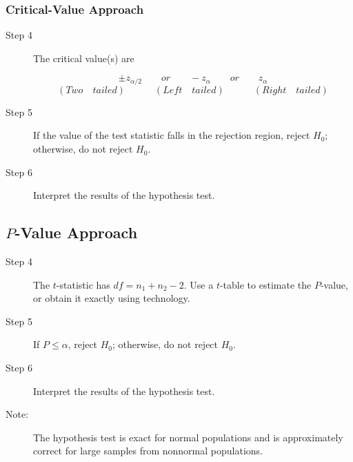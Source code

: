 \documentclass[12pt]{article}
\begin{document}
                \subsubsection*{Critical-Value Approach}
                    \begin{description}
                        \item[Step 4] The critical value(s) are
                        \begin{center}
                            \[
                                \pm z _{\alpha/2} \quad\quad or \quad\quad -z_{\alpha} \quad
                                \quad or \quad\quad z_{\alpha}     
                            \]
                            \[
                                (Two \quad tailed)\quad\quad\quad(Left \quad tailed)\quad\quad
                                \quad(Right \quad tailed)
                            \]
                        \end{center}
                        \item[Step 5] If the value of the test statistic falls in the rejection
                        region, reject $H_0$; otherwise, do not reject $H_0$.
                        \item[Step 6] Interpret the results of the hypothesis test.  
                    \end{description}
            \subsection*{$P$-Value Approach}
                \begin{description}
                    \item[Step 4] The $t$-statistic has $df = n_1 + n_2 - 2$. Use a $t$-table
                    to estimate the $P$-value, or obtain it exactly using technology.
                    \item[Step 5] If $P \leq \alpha$, reject $H_0$; otherwise, do not reject  
                    $H_0$.
                    \item[Step 6] Interpret the results of the hypothesis test.
                    \item[Note:] The hypothesis test is exact for normal populations and is
                    approximately correct for large samples from nonnormal populations.   
                \end{description}
\end{document}
